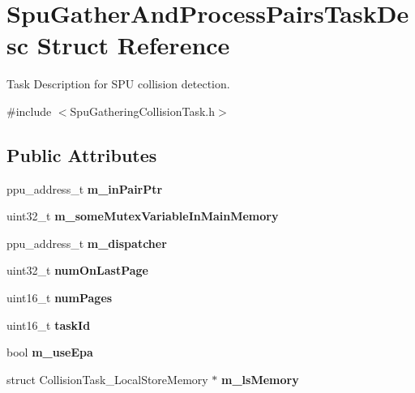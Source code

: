 \hypertarget{structSpuGatherAndProcessPairsTaskDesc}{}\section{Spu\+Gather\+And\+Process\+Pairs\+Task\+Desc Struct Reference}
\label{structSpuGatherAndProcessPairsTaskDesc}


Task Description for S\+PU collision detection.  




{\ttfamily \#include $<$Spu\+Gathering\+Collision\+Task.\+h$>$}

\subsection*{Public Attributes}
\begin{DoxyCompactItemize}
\item 
\mbox{\label{structSpuGatherAndProcessPairsTaskDesc_a44e209cf8fb7555571d0aa9ad2f48e97}} 
ppu\+\_\+address\+\_\+t {\bfseries m\+\_\+in\+Pair\+Ptr}
\item 
\mbox{\label{structSpuGatherAndProcessPairsTaskDesc_abf800c4cbc0891c59e71f407f9fae957}} 
uint32\+\_\+t {\bfseries m\+\_\+some\+Mutex\+Variable\+In\+Main\+Memory}
\item 
\mbox{\label{structSpuGatherAndProcessPairsTaskDesc_af66f9618c780454af54ac9e235b7eab1}} 
ppu\+\_\+address\+\_\+t {\bfseries m\+\_\+dispatcher}
\item 
\mbox{\label{structSpuGatherAndProcessPairsTaskDesc_ac5830645b4d3965a60cc8b8c844588e3}} 
uint32\+\_\+t {\bfseries num\+On\+Last\+Page}
\item 
\mbox{\label{structSpuGatherAndProcessPairsTaskDesc_aa85f2b591db679b9aa08fd68b75a4ec3}} 
uint16\+\_\+t {\bfseries num\+Pages}
\item 
\mbox{\label{structSpuGatherAndProcessPairsTaskDesc_a6498084824c8578acee347e88478e147}} 
uint16\+\_\+t {\bfseries task\+Id}
\item 
\mbox{\label{structSpuGatherAndProcessPairsTaskDesc_ae3863c304eba1ff806a476001c03ddfe}} 
bool {\bfseries m\+\_\+use\+Epa}
\item 
\mbox{\label{structSpuGatherAndProcessPairsTaskDesc_afb5398b65d9b719aa342f4aac25300ad}} 
struct Collision\+Task\+\_\+\+Local\+Store\+Memory $\ast$ {\bfseries m\+\_\+ls\+Memory}
\end{DoxyCompactItemize}


